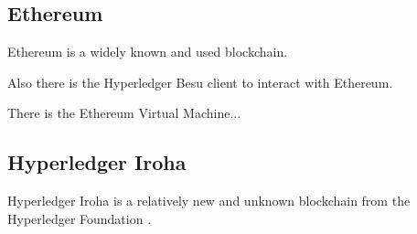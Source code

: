 \subsection{Ethereum} %
\label{sec:Ethereum}

Ethereum is a widely known and used blockchain.

Also there is the Hyperledger Besu \cite{hyperledger:wiki} client to interact with Ethereum.

There is the Ethereum Virtual Machine...


\subsection{Hyperledger Iroha} %
\label{sub:Hyperledger Iroha}

Hyperledger Iroha is a relatively new and unknown blockchain from the Hyperledger Foundation \cite{hyperledger:wiki}.


